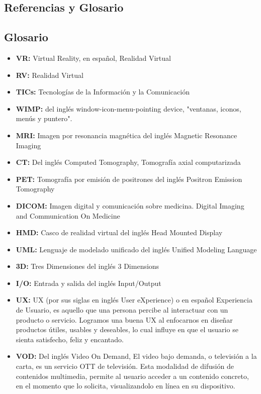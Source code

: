 \begin{center}
    \chapter{Referencias y Glosario}
\end{center}

    \newpage

\section{Glosario}
\begin{itemize}
 \item \textbf{VR:} Virtual Reality, en español, Realidad Virtual
 \item \textbf{RV:} Realidad Virtual
 \item \textbf{TICs:} Tecnologías de la Información y la Comunicación
 \item \textbf{WIMP:} del inglés window-icon-menu-pointing device, "ventanas, iconos, menús y puntero".
 \item \textbf{MRI:} Imagen por resonancia magnética del inglés Magnetic Resonance Imaging
 \item \textbf{CT:} Del inglés Computed Tomography, Tomografía axial computarizada
 \item \textbf{PET:} Tomografía por emisión de positrones del inglés Positron Emission Tomography
 \item \textbf{DICOM:} Imagen digital y comunicación sobre medicina. Digital Imaging and Communication On Medicine
 \item \textbf{HMD:} Casco de realidad virtual del inglés Head Mounted Display
 \item \textbf{UML:} Lenguaje de modelado unificado del inglés Unified Modeling Language
 \item \textbf{3D:} Tres Dimensiones del inglés 3 Dimensions
 \item \textbf{I/O:} Entrada y salida del inglés Input/Output
 \item \textbf{UX:} UX (por sus siglas en inglés User eXperience) o en español Experiencia de Usuario, es aquello que una persona percibe al interactuar con un producto o servicio. Logramos una buena UX al enfocarnos en diseñar productos útiles, usables y deseables, lo cual influye en que el usuario se sienta satisfecho, feliz y encantado.
 \item \textbf{VOD:} Del inglés  Video On Demand, El video bajo demanda, o televisión a la carta, es un servicio OTT de televisión. Esta modalidad de difusión de contenidos multimedia, permite al usuario acceder a un contenido concreto, en el momento que lo solicita, visualizandolo en línea en su dispositivo.

\end{itemize}
